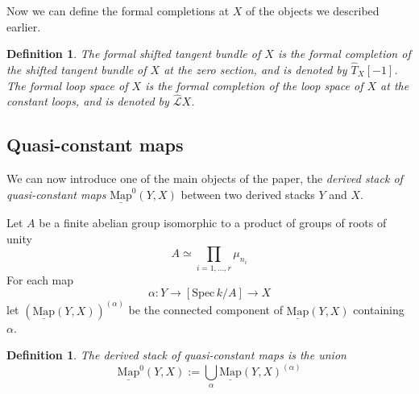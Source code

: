 \documentclass[11pt,letterpaper]{amsart}
\newtheorem{definition}[dummy]{Definition}
\newcommand{\cL}{\mathcal{L}}
\newcommand{\Map}[2]{\underline{\mathrm{Map}}\left (#1,#2\right )}
\newcommand{\Mapo}[2]{\underline{\mathrm{Map}}^{0}\left (#1,#2\right )}
\newcommand{\Spec}{\mathrm{S}\mathrm{pec}\,}
\begin{document}
Now we can define the formal completions at $X$ of the objects we described earlier.
\begin{definition}\label{def:formalloops}
The \emph{formal shifted tangent bundle} of $X$ is the formal completion of the shifted tangent bundle of $X$ at the zero section, and is denoted by $\widehat{T}_X[-1]$. The \emph{formal loop space} of $X$ is the formal completion of the loop space of $X$ at the constant loops, and is denoted by $\widehat{\cL}X$.
\end{definition}

\subsection{Quasi-constant maps}
\label{qcm}
We can now introduce one of the main objects of the paper, the \emph{derived stack of quasi-constant maps} $\Mapo{Y}{X}$ between two derived stacks $Y$ and $X$.  

Let $A$ be a finite abelian group isomorphic to a product of groups of roots of unity
\begin{equation}\label{eq:A}
 A \simeq \prod_{i=1, \ldots, r} \mu_{n_i}
\end{equation} 
For each map
$$
\alpha: Y \to [\Spec k/A] \to X
$$
let $(\Map{Y}{X})^{(\alpha)}$ be the connected component of $\Map{Y}{X}$ containing $\alpha$.
\begin{definition}
\label{quasiconstant}
 The \emph{derived stack of quasi-constant maps} is the union \begin{equation*}
\Mapo{Y}{X}:=\bigcup_{\alpha}\Map{Y}{X}^{(\alpha)}
\end{equation*}
\end{definition}
\end{document}
